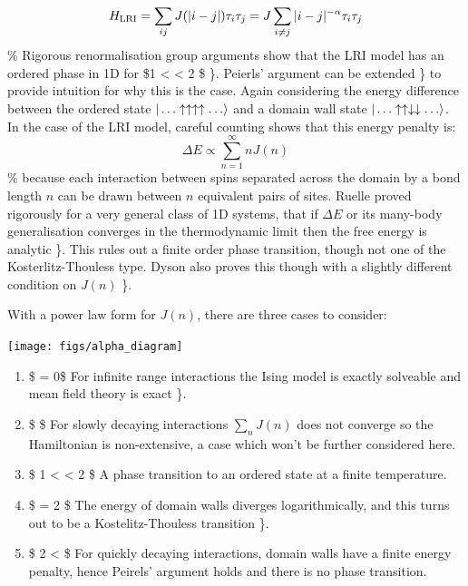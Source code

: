 \[H_{\mathrm{LRI}} = \sum_{ij} J(\abs{i-j}) \tau_i \tau_j = J \sum_{i\neq j} |i - j|^{-\alpha} \tau_i \tau_j\]
\% Rigorous renormalisation group arguments show that the LRI model has
an ordered phase in 1D for \$1 \textless{} \alpha \textless{} 2 \$
\textcite{dyson_existence_1969}\}. Peierls' argument can be extended
\textcite{thouless_long-range_1969}\} to provide intuition for why this
is the case. Again considering the energy difference between the ordered
state \(|\ldots\uparrow\uparrow\uparrow\uparrow\ldots\rangle\) and a
domain wall state
\(|\ldots\uparrow\uparrow\downarrow\downarrow\ldots\rangle\). In the case
of the LRI model, careful counting shows that this energy penalty is:
\[\Delta E \propto \sum_{n=1}^{\infty} n J(n)\] \% because each
interaction between spins separated across the domain by a bond length
\(n\) can be drawn between \(n\) equivalent pairs of sites. Ruelle
proved rigorously for a very general class of 1D systems, that if
\(\Delta E\) or its many-body generalisation converges in the
thermodynamic limit then the free energy is analytic
\textcite{ruelle_statistical_1968}\}. This rules out a finite order
phase transition, though not one of the Kosterlitz-Thouless type. Dyson
also proves this though with a slightly different condition on \(J(n)\)
\textcite{dyson_existence_1969}\}.

With a power law form for \(J(n)\), there are three cases to consider:

\begin{center}
    \texttt{[image: figs/alpha\_diagram]}
\end{center}

\begin{enumerate}
\def\labelenumi{\arabic{enumi}.}
\tightlist
\item
  \$ \alpha = 0\$ For infinite range interactions the Ising model is
  exactly solveable and mean field theory is exact
  \textcite{lipkin_validity_1965}\}.
\item
  \$ \alpha {}\$ For slowly decaying interactions \(\sum_n J(n)\)
  does not converge so the Hamiltonian is non-extensive, a case which
  won't be further considered here.
\item
  \$ 1 \textless{} \alpha \textless{} 2 \$ A phase transition to an
  ordered state at a finite temperature.
\item
  \$ \alpha = 2 \$ The energy of domain walls diverges logarithmically,
  and this turns out to be a Kostelitz-Thouless transition
  \textcite{thouless_long-range_1969}\}.
\item
  \$ 2 \textless{} \alpha \$ For quickly decaying interactions, domain
  walls have a finite energy penalty, hence Peirels' argument holds and
  there is no phase transition.
\end{enumerate}

